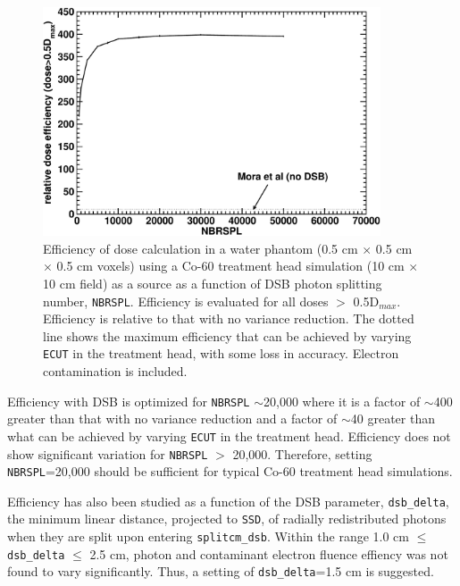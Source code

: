 \documentclass[12pt,twoside]{article}
\begin{document}
\begin{figure}[htbp]
\begin{center}
\includegraphics[width=10cm]{figures/dsb_deff_vs_nbrspl_espl}
\end{center}
\caption[Performance of DSB]
{Efficiency of dose calculation in a water phantom (0.5 cm $\times$ 0.5 cm $\times$ 0.5 cm voxels) using
a Co-60 treatment head simulation (10 cm $\times$ 10 cm field) as a source as a
function of DSB photon splitting number, {\tt NBRSPL}.  Efficiency is evaluated for all doses $>$ 0.5D$_{max}$.
Efficiency is relative to that with no variance reduction.  The dotted line shows the maximum efficiency
that can be achieved by varying {\tt ECUT} in the treatment head, with some loss in accuracy.  Electron
contamination is included.}
\label{dsb_deff_fig}
\end{figure}

Efficiency with DSB is optimized for {\tt NBRSPL} $\sim$20,000 where it is a factor of $\sim$400 greater than that
with no variance reduction and a factor of $\sim$40 greater than what can be achieved by varying {\tt ECUT}
in the treatment head.  Efficiency does not show significant variation for {\tt NBRSPL} $>$ 20,000.  Therefore,
setting {\tt NBRSPL}=20,000 should be sufficient for typical Co-60 treatment head simulations.

Efficiency has also been studied as a function of the DSB parameter, {\tt dsb\_delta}, the minimum linear
distance, projected to {\tt SSD}, of radially redistributed photons when they are split upon entering {\tt splitcm\_dsb}.  Within the range 1.0 cm $\leq$ {\tt dsb\_delta} $\leq$ 2.5 cm, photon and contaminant electron fluence effiency
was not found to vary significantly.  Thus, a setting of {\tt dsb\_delta}=1.5 cm is suggested.
\end{document}
